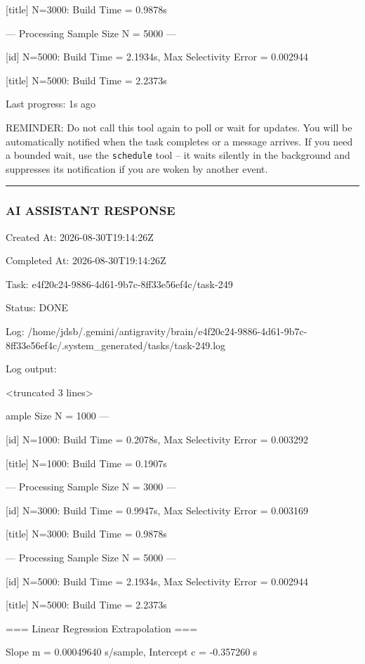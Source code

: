 \documentclass[11pt,a4paper]{article}
\begin{document}
{[title] N=3000: Build Time = 0.9878s


--- Processing Sample Size N = 5000 ---

[id] N=5000: Build Time = 2.1934s, Max Selectivity Error = 0.002944

[title] N=5000: Build Time = 2.2373s


Last progress: 1s ago



REMINDER: Do not call this tool again to poll or wait for updates. You will be automatically notified when the task completes or a message arrives. If you need a bounded wait, use the \texttt{schedule} tool -- it waits silently in the background and suppresses its notification if you are woken by another event.


\hrule

\subsubsection{AI ASSISTANT RESPONSE}

Created At: 2026-08-30T19:14:26Z

Completed At: 2026-08-30T19:14:26Z

Task: e4f20c24-9886-4d61-9b7c-8ff33e56ef4c/task-249

Status: DONE

Log: /home/jdsb/.gemini/antigravity/brain/e4f20c24-9886-4d61-9b7c-8ff33e56ef4c/.system\_generated/tasks/task-249.log

Log output:

<truncated 3 lines>

ample Size N = 1000 ---

[id] N=1000: Build Time = 0.2078s, Max Selectivity Error = 0.003292

[title] N=1000: Build Time = 0.1907s


--- Processing Sample Size N = 3000 ---

[id] N=3000: Build Time = 0.9947s, Max Selectivity Error = 0.003169

[title] N=3000: Build Time = 0.9878s


--- Processing Sample Size N = 5000 ---

[id] N=5000: Build Time = 2.1934s, Max Selectivity Error = 0.002944

[title] N=5000: Build Time = 2.2373s

=== Linear Regression Extrapolation ===

Slope m = 0.00049640 s/sample, Intercept c = -0.357260 s

}
\end{document}
